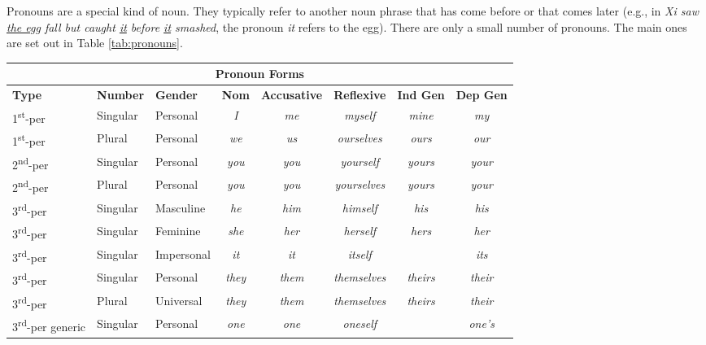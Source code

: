 Pronouns are a special kind of noun. They typically refer to another noun phrase that has come before or that comes later (e.g., in \textit{Xi saw \uline{the egg} fall but caught \uline{it} before \uline{it} smashed}, the pronoun \textit{it} refers to the egg). There are only a small number of pronouns. The main ones are set out in Table \ref{tab:pronouns}.

\begin{sidewaystable}
\centering
\caption{The main pronouns in Modern English}
\label{tab:pronouns}
\begin{tabular}{l l l c c c c c}
\multicolumn{8}{c}{\textbf{Pronoun Forms}} \\
\hline
\textbf{Type} & \textbf{Number} & \textbf{Gender} & \textbf{Nom} & \textbf{Accusative} & \textbf{Reflexive} & \textbf{Ind Gen} & \textbf{Dep Gen} \\
\hline
1\textsuperscript{st}-per & Singular & Personal & \textit{I} & \textit{me} & \textit{myself} & \textit{mine} & \textit{my} \\
1\textsuperscript{st}-per & Plural & Personal & \textit{we} & \textit{us} & \textit{ourselves} & \textit{ours} & \textit{our} \\
2\textsuperscript{nd}-per & Singular & Personal & \textit{you} & \textit{you} & \textit{yourself} & \textit{yours} & \textit{your} \\
2\textsuperscript{nd}-per & Plural & Personal & \textit{you} & \textit{you} & \textit{yourselves} & \textit{yours} & \textit{your} \\
3\textsuperscript{rd}-per & Singular & Masculine & \textit{he} & \textit{him} & \textit{himself} & \textit{his} & \textit{his} \\
3\textsuperscript{rd}-per & Singular & Feminine & \textit{she} & \textit{her} & \textit{herself} & \textit{hers} & \textit{her} \\
3\textsuperscript{rd}-per & Singular & Impersonal & \textit{it} & \textit{it} & \textit{itself} & & \textit{its} \\
3\textsuperscript{rd}-per & Singular & Personal & \textit{they} & \textit{them} & \textit{themselves} & \textit{theirs} & \textit{their} \\
3\textsuperscript{rd}-per & Plural & Universal & \textit{they} & \textit{them} & \textit{themselves} & \textit{theirs} & \textit{their} \\
3\textsuperscript{rd}-per generic & Singular & Personal & \textit{one} & \textit{one} & \textit{oneself} & & \textit{one's} \\

\end{tabular}
\end{sidewaystable}
